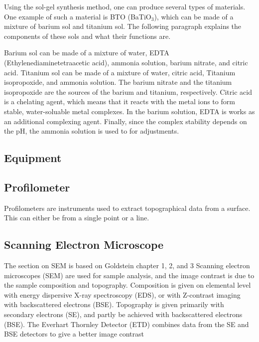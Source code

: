 \noindent Using the sol-gel synthesis method, one can produce several types of materials.
One example of such a material is BTO (BaTiO$_3$), which can be made of a mixture of barium sol and titanium sol.
The following paragraph explains the components of these sols and what their functions are.

Barium sol can be made of a mixture of water, EDTA (Ethylenediaminetetraacetic acid), ammonia solution, barium nitrate, and citric acid.
Titanium sol can be made of a mixture of water, citric acid, Titanium isopropoxide, and ammonia solution.
The barium nitrate and the titanium isopropoxide are the sources of the barium and titanium, respectively.
Citric acid is a chelating agent, which means that it reacts with the metal ions to form stable, water-soluable metal complexes.
In the barium solution, EDTA is works as an additional complexing agent.
Finally, since the complex stability depends on the pH, the ammonia solution is used to for adjustments.

\subsection{Equipment}

\subsection{Profilometer}

\noindent Profilometers are instruments used to extract topographical data from a surface.
This can either be from a single point or a line.

\subsection{Scanning Electron Microscope}

\noindent The section on SEM is based on Goldstein chapter 1, 2, and 3 %
Scanning electron microscopes (SEM) are used for sample analysis, and the image contrast is due to the sample composition and topography.
Composition is given on elemental level with energy dispersive X-ray spectroscopy (EDS), or with Z-contrast imaging with backscattered electrons (BSE).
Topography is given primarily with secondary electrons (SE), and partly be achieved with backscattered electrons (BSE).
The Everhart Thornley Detector (ETD) combines data from the SE and BSE detectors to give a better image contrast %


